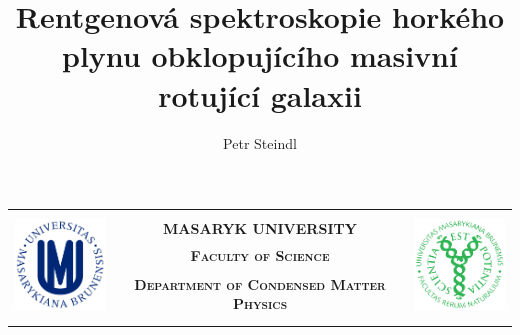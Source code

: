 \documentclass[
a4paper, %
11pt, %
onecolumn, %
openany, %
oldfontcommands,
]{memoir}
\author{Petr Steindl}
\title{Rentgenová spektroskopie horkého plynu obklopujícího masivní rotující galaxii}
\begin{document}
\frontmatter
\pagestyle{empty} %
\savepagenumber %

%	
%
%	
	

\restorepagenumber %

\begingroup
\setlength{\tabcolsep}{3pt}
	\begin{center}
	\centering
	\begin{tabular}{rcl}
		\multirow{5}{*}{\includegraphics[height=2.8cm]{MUNI_logo.png}} & &
		\multirow{5}{*}{\includegraphics[height=2.8cm]{PrF_logo2.png}}\\[-0.19cm]
		& \lsstyle\bfseries\Large {MASARYK UNIVERSITY}&\\[0.33cm]
		& \lsstyle\bfseries\Large\scshape {Faculty of Science} & \\[0.25cm]
		\lsstyle\bfseries\scshape & \small\lsstyle\bfseries\scshape {Department of Condensed Matter Physics} & \lsstyle\bfseries\scshape \\ 
		& & \\ [-0.3cm] \cmidrule[2pt]{2-2}
	\end{tabular}
\end{center}
\endgroup
\end{document}
